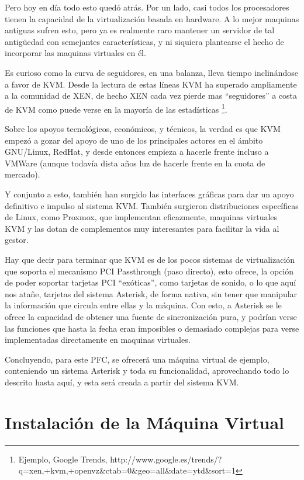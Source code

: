 Pero hoy en día todo esto quedó atrás. Por un lado, casi todos los procesadores tienen la capacidad de la virtualización basada en hardware. A lo mejor maquinas antiguas sufren esto, pero ya es realmente raro mantener un servidor de tal antigüedad con semejantes características, y ni siquiera plantearse el hecho de incorporar las maquinas virtuales en él.

Es curioso como la curva de seguidores, en una balanza, lleva tiempo inclinándose a favor de KVM. Desde la lectura de estas líneas KVM ha superado ampliamente a la comunidad de XEN, de hecho XEN cada vez pierde mas ``seguidores'' a costa de KVM como puede verse en la mayoría de las estadísticas \footnote{Ejemplo, Google Trends, http://www.google.es/trends/?q=xen,+kvm,+openvz\&ctab=0\&geo=all\&date=ytd\&sort=1}.

Sobre los apoyos tecnológicos, económicos, y técnicos, la verdad es que KVM empezó a gozar del apoyo de uno de los principales actores en el ámbito GNU/Linux, RedHat, y desde entonces empieza a hacerle frente incluso a VMWare (aunque todavía dista años luz de hacerle frente en la cuota de mercado).

Y conjunto a esto, también han surgido las interfaces gráficas para dar un apoyo definitivo e impulso al sistema KVM. También surgieron distribuciones específicas de Linux, como Proxmox, que implementan eficazmente, maquinas virtuales KVM y las dotan de complementos muy interesantes para facilitar la vida al gestor.

Hay que decir para terminar que KVM es de los pocos sistemas de virtualización que soporta el mecanismo PCI Passthrough (paso directo), esto ofrece, la opción de poder soportar tarjetas PCI “exóticas”, como tarjetas de sonido, o lo que aquí nos atañe, tarjetas del sistema Asterisk, de forma nativa, sin tener que manipular la información que circula entre ellas y la máquina. Con esto, a Asterisk se le ofrece la capacidad de obtener una fuente de sincronización pura, y podrían verse las funciones que hasta la fecha eran imposibles o demasiado complejas para verse implementadas directamente en maquinas virtuales.

Concluyendo, para este PFC, se ofrecerá una máquina virtual de ejemplo, conteniendo un sistema Asterisk y toda su funcionalidad, aprovechando todo lo descrito hasta aquí, y esta será creada a partir del sistema KVM.

\section{Instalación de la Máquina Virtual} \label{cap:instkvm}

